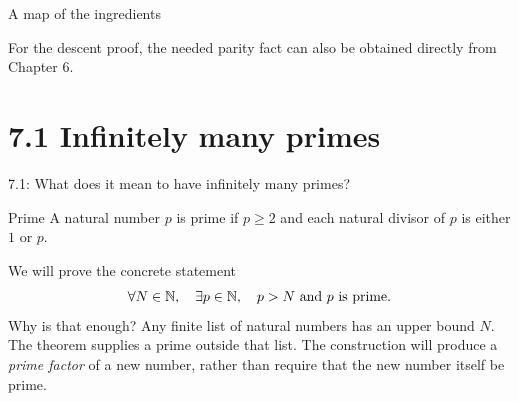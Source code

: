 \begin{frame}{A map of the ingredients}
\begin{center}
\end{center}
For the descent proof, the needed parity fact can also be obtained directly from Chapter 6.
\end{frame}

\section{7.1 Infinitely many primes}
\begin{frame}{7.1: What does it mean to have infinitely many primes?}
\begin{block}{Prime}
A natural number $p$ is prime if $p\ge2$ and each natural divisor of $p$ is either $1$ or $p$.
\end{block}
We will prove the concrete statement
\[
\forall N\in\mathbb{N},\quad\exists p\in\mathbb{N},\quad p>N\text{ and }p\text{ is prime}.
\]
Why is that enough? Any finite list of natural numbers has an upper bound $N$. The theorem supplies a prime outside that list.
\medskip
The construction will produce a \emph{prime factor} of a new number, rather than require that the new number itself be prime.
\end{frame}

